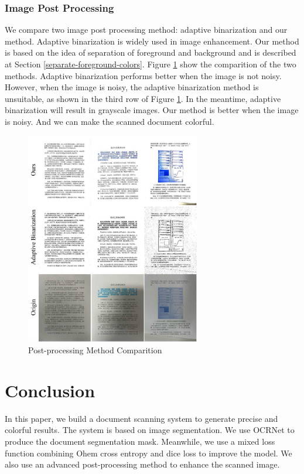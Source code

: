 \documentclass[10pt, conference, compsocconf]{IEEEtran}
\begin{document}
\subsubsection{Image Post Processing}
We compare two image post processing method: adaptive binarization and our method. 
Adaptive binarization is widely used in image enhancement. 
Our method is based on the idea of separation of foreground and background and is described at Section \ref{separate-foreground-colors}.
Figure \ref{figure:post-process} show the comparition of the two methods.
Adaptive binarization performs better when the image is not noisy.
However, when the image is noisy, the adaptive binarization method is unsuitable, as shown in the third row of Figure \ref{figure:post-process}.
In the meantime, adaptive binarization will result in grayscale images.
Our method is better when the image is noisy. 
And we can make the scanned document colorful.

\begin{figure}[!h]
	\centering
	\label{figure:post-process}
	\includegraphics[width=3.0in]{./Assets/12345.jpg}
	\caption{Post-processing Method Comparition}
\end{figure}



\section{Conclusion}

In this paper, we build a document scanning system to generate precise and colorful results.
The system is based on image segmentation. We use OCRNet to produce the document segmentation mask. Meanwhile, we use a mixed loss function combining Ohem cross entropy and dice loss to improve the model.
We also use an advanced post-processing method to enhance the scanned image.
\end{document}
